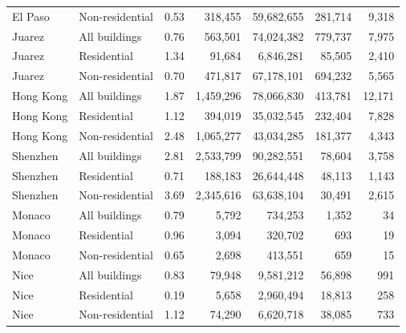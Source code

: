 {\begin{tabular}{@{}llrrrrr@{}}
El Paso & Non-residential & 0.53 & 318,455 & 59,682,655 & 281,714 & 9,318 \\
Juarez & All buildings & 0.76 & 563,501 & 74,024,382 & 779,737 & 7,975 \\
Juarez & Residential & 1.34 & 91,684 & 6,846,281 & 85,505 & 2,410 \\
Juarez & Non-residential & 0.70 & 471,817 & 67,178,101 & 694,232 & 5,565 \\
Hong Kong & All buildings & 1.87 & 1,459,296 & 78,066,830 & 413,781 & 12,171 \\
Hong Kong & Residential & 1.12 & 394,019 & 35,032,545 & 232,404 & 7,828 \\
Hong Kong & Non-residential & 2.48 & 1,065,277 & 43,034,285 & 181,377 & 4,343 \\
Shenzhen & All buildings & 2.81 & 2,533,799 & 90,282,551 & 78,604 & 3,758 \\
Shenzhen & Residential & 0.71 & 188,183 & 26,644,448 & 48,113 & 1,143 \\
Shenzhen & Non-residential & 3.69 & 2,345,616 & 63,638,104 & 30,491 & 2,615 \\
Monaco & All buildings & 0.79 & 5,792 & 734,253 & 1,352 & 34 \\
Monaco & Residential & 0.96 & 3,094 & 320,702 & 693 & 19 \\
Monaco & Non-residential & 0.65 & 2,698 & 413,551 & 659 & 15 \\
Nice & All buildings & 0.83 & 79,948 & 9,581,212 & 56,898 & 991 \\
Nice & Residential & 0.19 & 5,658 & 2,960,494 & 18,813 & 258 \\
Nice & Non-residential & 1.12 & 74,290 & 6,620,718 & 38,085 & 733 \\
\bottomrule
\end{tabular}
}
